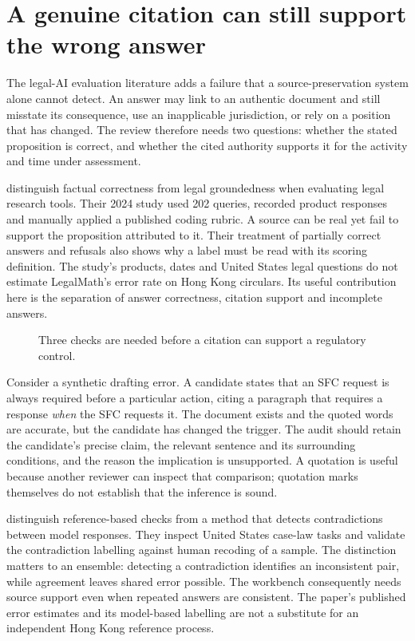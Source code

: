 \section{A genuine citation can still support the wrong answer}
\label{sec:legal-ai-source-support}

The legal-AI evaluation literature adds a failure that a source-preservation
system alone cannot detect. An answer may link to an authentic document and
still misstate its consequence, use an inapplicable jurisdiction, or rely on a
position that has changed. The review therefore needs two questions: whether
the stated proposition is correct, and whether the cited authority supports it
for the activity and time under assessment.

\citet[sections 4--5 and appendix C]{legalrag2024} distinguish factual
correctness from legal groundedness when evaluating legal research tools. Their
2024 study used 202 queries, recorded product responses and manually applied
a published coding rubric. A source can be real yet fail to support the
proposition attributed to it. Their treatment of partially correct answers and
refusals also shows why a label must be read with its scoring definition. The
study's products, dates and United States legal questions do not estimate
LegalMath's error rate on Hong Kong circulars. Its useful contribution here is
the separation of answer correctness, citation support and incomplete answers.

\begin{figure}[H]
\centering
{}
\caption{Three checks are needed before a citation can support a regulatory control.}
\label{fig:citation-three-checks}
\end{figure}

Consider a synthetic drafting error. A candidate states that an SFC request is
always required before a particular action, citing a paragraph that requires a
response \emph{when} the SFC requests it. The document exists and the quoted
words are accurate, but the candidate has changed the trigger. The audit should
retain the candidate's precise claim, the relevant sentence and its surrounding
conditions, and the reason the implication is unsupported. A quotation is useful
because another reviewer can inspect that comparison; quotation marks themselves
do not establish that the inference is sound.

\citet[sections 4.2--4.3 and appendix C]{legalfictions2024} distinguish
reference-based checks from a method that detects contradictions between model
responses. They inspect United States case-law tasks and validate the
contradiction labelling against human recoding of a sample. The distinction
matters to an ensemble: detecting a contradiction identifies an inconsistent
pair, while agreement leaves shared error possible. The workbench consequently
needs source support even when repeated answers are consistent. The paper's
published error estimates and its model-based labelling are not a substitute
for an independent Hong Kong reference process.

